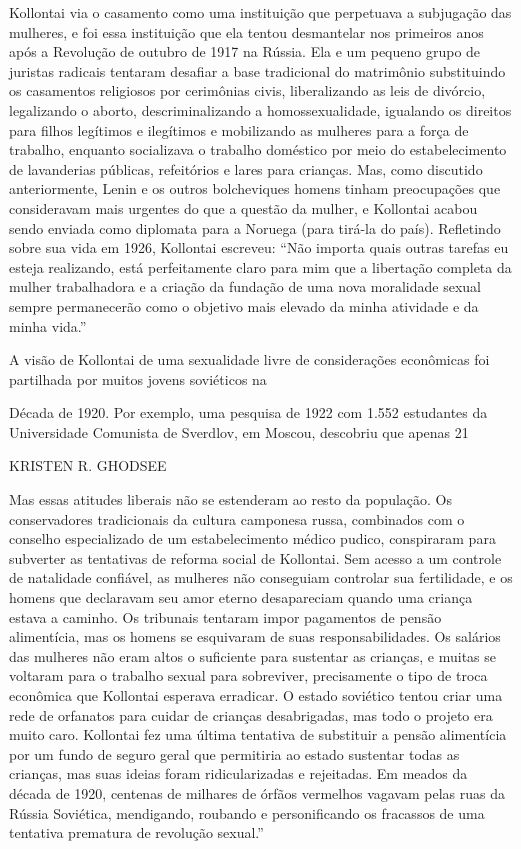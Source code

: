 Kollontai via o casamento como uma instituição que perpetuava a subjugação das mulheres, e foi essa instituição que ela tentou desmantelar nos primeiros anos após a Revolução de outubro de 1917 na Rússia. Ela e um pequeno grupo de juristas radicais tentaram desafiar a base tradicional do matrimônio substituindo os casamentos religiosos por cerimônias civis, liberalizando as leis de divórcio, legalizando o aborto, descriminalizando a homossexualidade, igualando os direitos para filhos legítimos e ilegítimos e mobilizando as mulheres para a força de trabalho, enquanto socializava o trabalho doméstico por meio do estabelecimento de lavanderias públicas, refeitórios e lares para crianças. Mas, como discutido anteriormente, Lenin e os outros bolcheviques homens tinham preocupações que consideravam mais urgentes do que a questão da mulher, e Kollontai acabou sendo enviada como diplomata para a Noruega (para tirá-la do país). Refletindo sobre sua vida em 1926, Kollontai escreveu: “Não importa quais outras tarefas eu esteja realizando, está perfeitamente claro para mim que a libertação completa da mulher trabalhadora e a criação da fundação de uma nova moralidade sexual sempre permanecerão como o objetivo mais elevado da minha atividade e da minha vida.”
 \par 
A visão de Kollontai de uma sexualidade livre de considerações econômicas foi partilhada por muitos jovens soviéticos na
 \par 
Década de 1920. Por exemplo, uma pesquisa de 1922 com {\color{blue}1}.{\color{blue}552} estudantes da Universidade Comunista de Sverdlov, em Moscou, descobriu que apenas 21%
 \par 
KRISTEN R. GHODSEE
 \par 
Mas essas atitudes liberais não se estenderam ao resto da população. Os conservadores tradicionais da cultura camponesa russa, combinados com o conselho especializado de um estabelecimento médico pudico, conspiraram para subverter as tentativas de reforma social de Kollontai. Sem acesso a um controle de natalidade confiável, as mulheres não conseguiam controlar sua fertilidade, e os homens que declaravam seu amor eterno desapareciam quando uma criança estava a caminho. Os tribunais tentaram impor pagamentos de pensão alimentícia, mas os homens se esquivaram de suas responsabilidades. Os salários das mulheres não eram altos o suficiente para sustentar as crianças, e muitas se voltaram para o trabalho sexual para sobreviver, precisamente o tipo de troca econômica que Kollontai esperava erradicar. O estado soviético tentou criar uma rede de orfanatos para cuidar de crianças desabrigadas, mas todo o projeto era muito caro. Kollontai fez uma última tentativa de substituir a pensão alimentícia por um fundo de seguro geral que permitiria ao estado sustentar todas as crianças, mas suas ideias foram ridicularizadas e rejeitadas. Em meados da década de 1920, centenas de milhares de órfãos vermelhos vagavam pelas ruas da Rússia Soviética, mendigando, roubando e personificando os fracassos de uma tentativa prematura de revolução sexual.”
